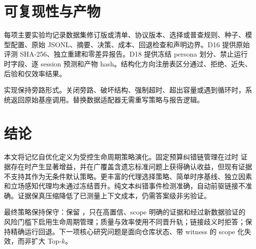 \section{可复现性与产物}

每项主要实验均记录数据集修订版或清单、协议版本、选择或普查规则、种子、模型配置、原始 JSONL、摘要、决策、成本、回退检查和声明边界。D16 提供原始评测 SHA-256、独立重建和零差异报告。D18 提供冻结 persona 划分、禁止运行时字段、逐 session 预测和产物 hash。结构化方向注册表区分通过、拒绝、近失、后验和仅效率结果。

实现保持旁路形式。关闭旁路、破坏结构、强制超时、超出容量或遇到循环时，系统返回原始基座调用。替换数据适配器无需重写策略与报告逻辑。

\section{结论}

本文将记忆自优化定义为受控生命周期策略演化。固定预算纠错链管理在过时 \base 证据存在时产生显著增益，并在广覆盖含遗忘标准问题上获得确认收益，但现有证据不支持其作为无条件默认策略。更丰富的代理选择策略、简单时序基线、独立因素和立场感知代理均未通过冻结晋升。纯文本纠错事件检测准确，自动前驱链接不准确。证据保真压缩降低了已测量上下文成本，仍需答案级非劣验证。

最终策略保持保守：保留 \base，只在高置信、scope 明确的证据和经过新数据验证的风险门槛下启用生命周期管理；质量与效率使用不同晋升轨；链接歧义时拒答；保持精确运行回退。下一项核心研究问题是面向仓库状态、带 witness 的 scope 化失效，而非扩大 Top-$k$。


\small

